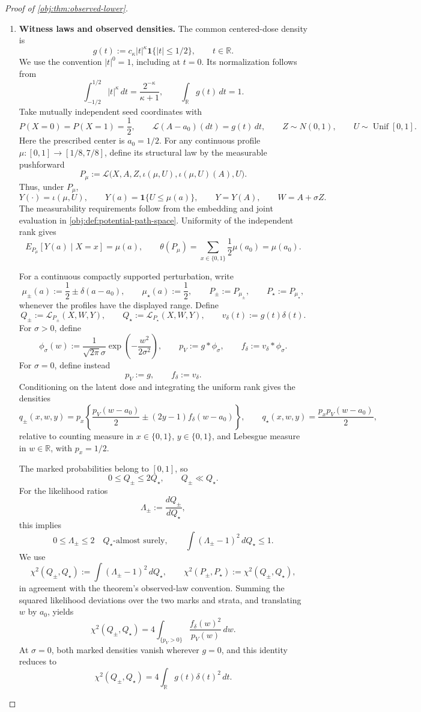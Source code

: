 \documentclass[11pt]{article}
\begin{document}
\begin{proof}[Proof of \cref{obj:thm:observed-lower}]
\begin{enumerate}
\item \textbf{Witness laws and observed densities.}
The common centered-dose density is
\[
g(t):=c_\kappa|t|^\kappa\mathbf1\{|t|\le1/2\},
\qquad t\in\mathbb R.
\]
We use the convention \(|t|^0=1\), including at \(t=0\). Its normalization follows from
\[
\int_{-1/2}^{1/2}|t|^\kappa\,dt
=\frac{2^{-\kappa}}{\kappa+1},
\qquad
\int_{\mathbb R}g(t)\,dt=1.
\]
Take mutually independent seed coordinates with
\[
P(X=0)=P(X=1)=\frac12,\qquad
\mathcal L(A-a_0)(dt)=g(t)\,dt,\qquad
Z\sim N(0,1),\qquad U\sim\operatorname{Unif}[0,1].
\]
Here the prescribed center is \(a_0=1/2\). For any continuous profile
\(\mu:[0,1]\to[1/8,7/8]\), define its structural law by the measurable pushforward
\[
P_\mu:=
\mathcal L\bigl(X,A,Z,\iota(\mu,U),\iota(\mu,U)(A),U\bigr).
\]
Thus, under \(P_\mu\),
\[
Y(\cdot)=\iota(\mu,U),\qquad
Y(a)=\mathbf1\{U\le\mu(a)\},\qquad
Y=Y(A),\qquad W=A+\sigma Z.
\]
The measurability requirements follow from the embedding and joint evaluation in \cref{obj:def:potential-path-space}. Uniformity of the independent rank gives
\[
E_{P_\mu}[Y(a)\mid X=x]=\mu(a),
\qquad
\theta(P_\mu)=\sum_{x\in\{0,1\}}\frac12\mu(a_0)=\mu(a_0).
\]

For a continuous compactly supported perturbation, write
\[
\mu_\pm(a):=\frac12\pm\delta(a-a_0),\qquad
\mu_\star(a):=\frac12,\qquad
P_\pm:=P_{\mu_\pm},\qquad P_\star:=P_{\mu_\star},
\]
whenever the profiles have the displayed range. Define
\[
Q_\pm:=\mathcal L_{P_\pm}(X,W,Y),\qquad
Q_\star:=\mathcal L_{P_\star}(X,W,Y),\qquad
v_\delta(t):=g(t)\delta(t).
\]
For \(\sigma>0\), define
\[
\phi_\sigma(w):=
\frac{1}{\sqrt{2\pi}\sigma}
\exp\left(-\frac{w^2}{2\sigma^2}\right),
\qquad
p_V:=g*\phi_\sigma,\qquad f_\delta:=v_\delta*\phi_\sigma.
\]
For \(\sigma=0\), define instead
\[
p_V:=g,\qquad f_\delta:=v_\delta.
\]
Conditioning on the latent dose and integrating the uniform rank gives the densities
\[
q_\pm(x,w,y)
=
p_x\left\{\frac{p_V(w-a_0)}2
\pm(2y-1)f_\delta(w-a_0)\right\},
\qquad
q_\star(x,w,y)=\frac{p_xp_V(w-a_0)}2,
\]
relative to counting measure in \(x\in\{0,1\}\), \(y\in\{0,1\}\), and Lebesgue measure in \(w\in\mathbb R\), with \(p_x=1/2\).

The marked probabilities belong to \([0,1]\), so
\[
0\le Q_\pm\le2Q_\star,\qquad Q_\pm\ll Q_\star.
\]
For the likelihood ratios
\[
\Lambda_\pm:=\frac{dQ_\pm}{dQ_\star},
\]
this implies
\[
0\le\Lambda_\pm\le2\quad Q_\star\text{-almost surely},
\qquad
\int(\Lambda_\pm-1)^2\,dQ_\star\le1.
\]
We use
\[
\chi^2(Q_\pm,Q_\star):=
\int(\Lambda_\pm-1)^2\,dQ_\star,
\qquad
\chi^2(P_\pm,P_\star):=\chi^2(Q_\pm,Q_\star),
\]
in agreement with the theorem's observed-law convention. Summing the squared likelihood deviations over the two marks and strata, and translating \(w\) by \(a_0\), yields
\[
\chi^2(Q_\pm,Q_\star)
=
4\int_{\{p_V>0\}}\frac{f_\delta(w)^2}{p_V(w)}\,dw.
\]
At \(\sigma=0\), both marked densities vanish wherever \(g=0\), and this identity reduces to
\[
\chi^2(Q_\pm,Q_\star)
=4\int_{\mathbb R}g(t)\delta(t)^2\,dt.
\]


\end{enumerate}
\end{proof}
\end{document}
